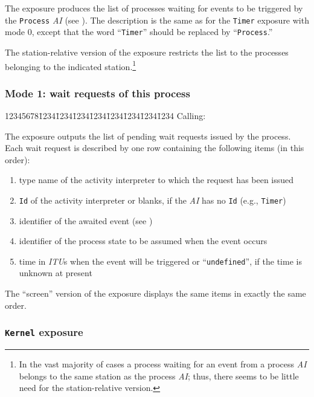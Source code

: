 The exposure produces the
list of processes waiting for events to be triggered by the {\tt Process}
{\em AI\/} (see ).
The description is the same as for the {\tt Timer} exposure
with mode 0, except that the word ``{\tt Timer}'' should be replaced by
``{\tt Process}.''

The station-relative version of the exposure restricts the list to the
processes belonging to the indicated station.\footnote{In the vast majority
of cases a process waiting for an event from a
process {\em AI\/} belongs to the same station as the process {\em AI};
thus, there seems to be little need for the station-relative version.}

\subsubsection*{Mode 1: wait requests of this process}

{\tt\begin{tabbing}
12345678\=1234\=1234\=1234\=1234\=1234\=1234\=1234\=1234\kill
{\rm Calling:}
\end{tabbing}}

The exposure outputs the list of pending wait requests issued by the process.
Each wait request is described by one row containing the following items
(in this order):

\begin{enumerate}
\item
type name of the activity interpreter to which the request has been
issued
\item
{\tt Id} of the activity interpreter or blanks, if the
{\em AI\/} has no {\tt Id} (e.g., {\tt Timer})
\item
identifier of the awaited event (see )
\item
identifier of the process state to be assumed when the event occurs
\item
time in {\em ITU\/}s when the event will be triggered or
``{\tt undefined}'', if the time is unknown at present
\end{enumerate}

The ``screen'' version of the exposure displays the same items in exactly
the same order.

\subsubsection{{\tt Kernel} exposure}
\label{rm_ex_se_ke}

